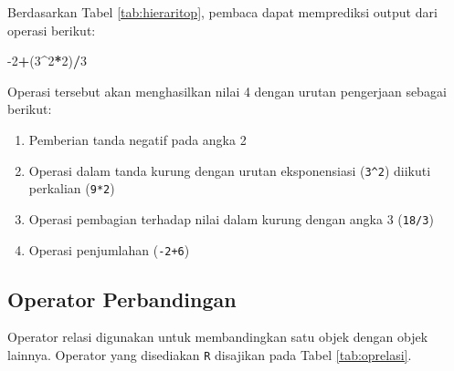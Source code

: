 \documentclass[12pt,]{krantz}
\newenvironment{Shaded}{\begin{snugshade}}{\end{snugshade}}
\newcommand{\DecValTok}[1]{\textcolor[rgb]{0.00,0.00,0.81}{#1}}
\newcommand{\NormalTok}[1]{#1}
\newcommand{\OperatorTok}[1]{\textcolor[rgb]{0.81,0.36,0.00}{\textbf{#1}}}
\providecommand{\tightlist}{%
  \setlength{\itemsep}{0pt}\setlength{\parskip}{0pt}}
\begin{document}
Berdasarkan Tabel \ref{tab:hieraritop}, pembaca dapat memprediksi output dari operasi berikut:

\begin{Shaded}
\begin{Highlighting}[]
\DecValTok{-2}\OperatorTok{+}\NormalTok{(}\DecValTok{3}\OperatorTok{^}\DecValTok{2}\OperatorTok{*}\DecValTok{2}\NormalTok{)}\OperatorTok{/}\DecValTok{3}
\end{Highlighting}
\end{Shaded}

Operasi tersebut akan menghasilkan nilai 4 dengan urutan pengerjaan sebagai berikut:

\begin{enumerate}
\def\labelenumi{\arabic{enumi}.}
\tightlist
\item
  Pemberian tanda negatif pada angka 2
\item
  Operasi dalam tanda kurung dengan urutan eksponensiasi (\texttt{3\^{}2}) diikuti perkalian (\texttt{9*2})
\item
  Operasi pembagian terhadap nilai dalam kurung dengan angka 3 (\texttt{18/3})
\item
  Operasi penjumlahan (\texttt{-2+6})
\end{enumerate}

\hypertarget{operator-perbandingan}{%
\subsection{Operator Perbandingan}\label{operator-perbandingan}}

Operator relasi digunakan untuk membandingkan satu objek dengan objek lainnya. Operator yang disediakan \texttt{R} disajikan pada Tabel \ref{tab:oprelasi}.
\end{document}
